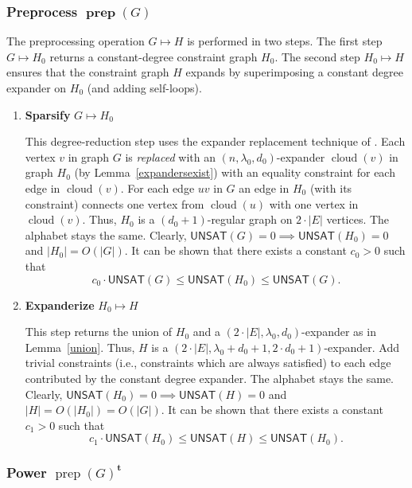 \documentclass{article}
\newcommand{\UNSAT}{\mathsf{UNSAT}}
\newcommand{\prep}{{\operatorname{prep}}}
\newcommand{\cloud}{{\operatorname{cloud}}}
\begin{document}
\subsubsection*{Preprocess $\boldsymbol{\prep}(G)$}

The preprocessing operation $G \mapsto H$ is performed in two steps.
The first step $G \mapsto H_0$ returns a constant-degree constraint graph $H_0$.
The second step $H_0 \mapsto H$ ensures that the constraint graph $H$
expands by superimposing a constant degree expander on $H_0$ (and adding self-loops).

\begin{enumerate}
\item \textbf{Sparsify} $G \mapsto H_0$

This degree-reduction step uses the expander replacement technique of
\cite{papadimitriou1991optimization}.
Each vertex $v$ in graph $G$ is \emph{replaced} with an $(n, \lambda_0, d_0)$-expander
$\cloud(v)$ in graph $H_0$ (by Lemma~\ref{expandersexist})
with an equality constraint for each edge in $\cloud(v)$.
For each edge $uv$ in $G$ an edge in $H_0$ (with its constraint)
connects one vertex from $\cloud(u)$ with one vertex in $\cloud(v)$.
Thus, $H_0$ is a $(d_0+1)$-regular graph on $2\cdot|E|$ vertices.
The alphabet stays the same.
Clearly, $\UNSAT(G)=0 \implies \UNSAT(H_0)=0$ and $|H_0|=O(|G|)$.
It can be shown that there exists a constant $c_0>0$ such that
$$
c_0\cdot\UNSAT(G) \le \UNSAT(H_0) \le \UNSAT(G). 
$$

\item \textbf{Expanderize} $H_0 \mapsto H$

This step returns the union of $H_0$ and a $(2\cdot|E|, \lambda_0, d_0)$-expander
as in Lemma~\ref{union}.
Thus, $H$ is a $(2\cdot|E|, \lambda_0 + d_0 + 1, 2\cdot d_0 + 1)$-expander.
Add trivial constraints (i.e., constraints which are always satisfied)
to each edge contributed by the constant degree expander.
The alphabet stays the same.
Clearly, $\UNSAT(H_0)=0 \implies \UNSAT(H)=0$
and $|H|=O(|H_0|)=O(|G|)$.
It can be shown that there exists a constant $c_1>0$ such that
$$
c_1\cdot\UNSAT(H_0) \le \UNSAT(H) \le \UNSAT(H_0). 
$$

\end{enumerate}

\subsubsection*{Power $\prep(G)^{\boldsymbol{t}}$}
\end{document}
